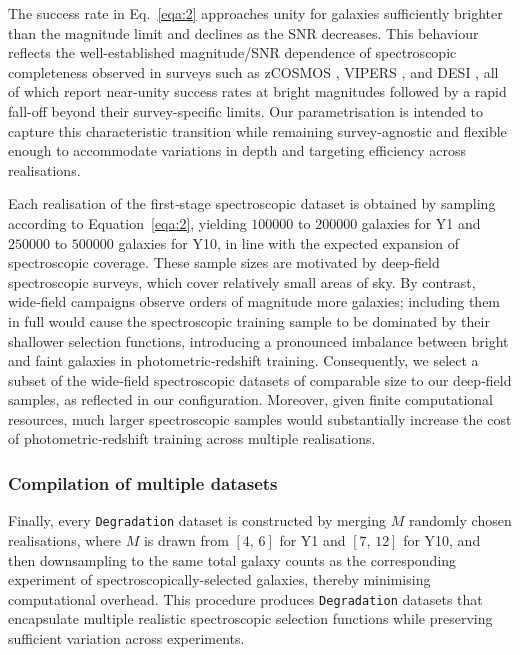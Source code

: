 The success rate in Eq.~\ref{eqa:2} approaches unity for galaxies sufficiently brighter than the magnitude limit and declines as the SNR decreases. This behaviour reflects the well-established magnitude/SNR dependence of spectroscopic completeness observed in surveys such as zCOSMOS \citep{2009ApJS..184..218L}, VIPERS \citep{2014A&A...566A.108G}, and DESI \citep{2023AJ....165..126R}, all of which report near-unity success rates at bright magnitudes followed by a rapid fall-off beyond their survey-specific limits. Our parametrisation is intended to capture this characteristic transition while remaining survey-agnostic and flexible enough to accommodate variations in depth and targeting efficiency across realisations.

Each realisation of the first‐stage spectroscopic dataset is obtained by sampling according to Equation~\ref{eqa:2}, yielding \(100000\) to \(200000\) galaxies for Y1 and \(250000\) to \(500000\) galaxies for Y10, in line with the expected expansion of spectroscopic coverage. These sample sizes are motivated by deep‐field spectroscopic surveys, which cover relatively small areas of sky. By contrast, wide‐field campaigns observe orders of magnitude more galaxies; including them in full would cause the spectroscopic training sample to be dominated by their shallower selection functions, introducing a pronounced imbalance between bright and faint galaxies in photometric‐redshift training. Consequently, we select a subset of the wide‐field spectroscopic datasets of comparable size to our deep‐field samples, as reflected in our configuration. Moreover, given finite computational resources, much larger spectroscopic samples would substantially increase the cost of photometric‐redshift training across multiple realisations.

\subsubsection{Compilation of multiple datasets}

Finally, every \texttt{Degradation} dataset is constructed by merging \(M\) randomly chosen realisations, where \(M\) is drawn from \([4,\, 6]\) for Y1 and \([7,\, 12]\) for Y10, and then downsampling to the same total galaxy counts as the corresponding experiment of spectroscopically-selected galaxies, thereby minimising computational overhead. This procedure produces \texttt{Degradation} datasets that encapsulate multiple realistic spectroscopic selection functions while preserving sufficient variation across experiments.  

